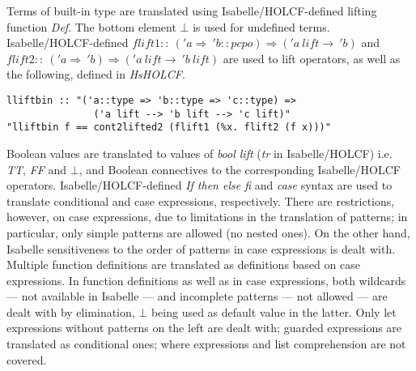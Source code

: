 \documentclass{llncs}
\begin{document}
Terms of built-in type are translated using Isabelle/HOLCF-defined lifting function
\emph{Def}.  The bottom element $\bot$ is used for undefined terms.
Isabelle/HOLCF-defined $\mathit{flift1} :: \ ('a \Rightarrow \ 'b::pcpo) \Rightarrow ('a
\ \mathit{lift} \to \ 'b)$ and $\mathit{flift2} :: \ ('a \Rightarrow \ 'b) \Rightarrow ('a \ \mathit{lift}
\to \ 'b \ 
\mathit{lift})$ are used to lift operators, as well as the following, defined in
\emph{HsHOLCF}.\\

\begin{verbatim}
lliftbin :: "('a::type => 'b::type => 'c::type) => 
               ('a lift --> 'b lift --> 'c lift)"
"lliftbin f == cont2lifted2 (flift1 (%x. flift2 (f x)))"
\end{verbatim}
\noindent Boolean values are translated to values of \emph{bool lift} 
(\emph{tr} in Isabelle/HOLCF) i.e.  \emph{TT}, \emph{FF} and $\bot$, and
Boolean connectives to the corresponding Isabelle/HOLCF operators.
Isabelle/HOLCF-defined \emph{If then else fi} and \emph{case} syntax are used
to translate conditional and case expressions, respectively.  There are
restrictions, however, on case expressions, due to limitations in the
translation of patterns; in particular, only simple patterns are allowed (no
nested ones). On the other hand, Isabelle sensitiveness to the order of
patterns in case expressions is dealt with. Multiple function definitions are
translated as definitions based on case expressions. In function definitions
as well as in case expressions, both wildcards --- not available in Isabelle
--- and incomplete patterns --- not allowed --- are dealt with by elimination,
$\bot$ being used as default value in the latter. Only let expressions
without patterns on the left are dealt with; guarded expressions are
translated as conditional ones; where expressions and list comprehension are
not covered.
\end{document}
